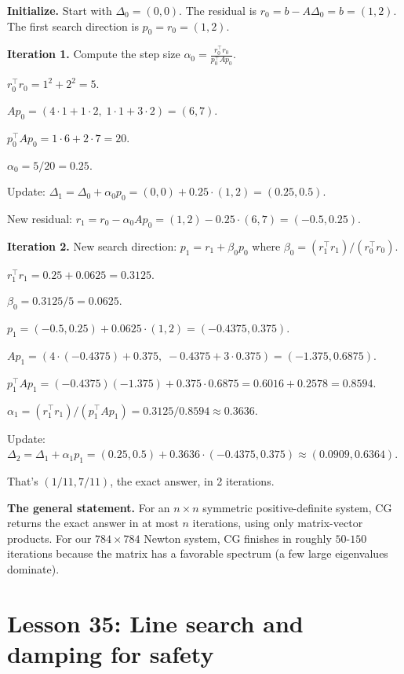 \documentclass[11pt]{article}
\begin{document}
\textbf{Initialize.} Start with $\Delta_0 = (0, 0)$. The residual is
$r_0 = b - A \Delta_0 = b = (1, 2)$. The first search direction is
$p_0 = r_0 = (1, 2)$.

\textbf{Iteration 1.} Compute the step size $\alpha_0 = \frac{r_0^\top
r_0}{p_0^\top A p_0}$.

$r_0^\top r_0 = 1^2 + 2^2 = 5$.

$A p_0 = (4\cdot 1 + 1\cdot 2,\; 1\cdot 1 + 3\cdot 2) = (6, 7)$.

$p_0^\top A p_0 = 1\cdot 6 + 2\cdot 7 = 20$.

$\alpha_0 = 5/20 = 0.25$.

Update: $\Delta_1 = \Delta_0 + \alpha_0 p_0 = (0, 0) + 0.25\cdot(1, 2) =
(0.25, 0.5)$.

New residual: $r_1 = r_0 - \alpha_0 A p_0 = (1, 2) - 0.25\cdot(6, 7) =
(-0.5, 0.25)$.

\textbf{Iteration 2.} New search direction: $p_1 = r_1 + \beta_0 p_0$
where $\beta_0 = (r_1^\top r_1) / (r_0^\top r_0)$.

$r_1^\top r_1 = 0.25 + 0.0625 = 0.3125$.

$\beta_0 = 0.3125 / 5 = 0.0625$.

$p_1 = (-0.5, 0.25) + 0.0625 \cdot (1, 2) = (-0.4375, 0.375)$.

$A p_1 = (4\cdot(-0.4375) + 0.375,\; -0.4375 + 3\cdot 0.375) =
(-1.375, 0.6875)$.

$p_1^\top A p_1 = (-0.4375)(-1.375) + 0.375\cdot 0.6875 = 0.6016 +
0.2578 = 0.8594$.

$\alpha_1 = (r_1^\top r_1) / (p_1^\top A p_1) = 0.3125 / 0.8594 \approx 0.3636$.

Update: $\Delta_2 = \Delta_1 + \alpha_1 p_1 = (0.25, 0.5) + 0.3636 \cdot
(-0.4375, 0.375) \approx (0.0909, 0.6364)$.

That's $(1/11, 7/11)$, the exact answer, in 2 iterations.

\textbf{The general statement.} For an $n \times n$ symmetric
positive-definite system, CG returns the exact answer in at most $n$
iterations, using only matrix-vector products. For our $784 \times
784$ Newton system, CG finishes in roughly $50$-$150$ iterations
because the matrix has a favorable spectrum (a few large eigenvalues
dominate).

\section{Lesson 35: Line search and damping for safety}
\end{document}
